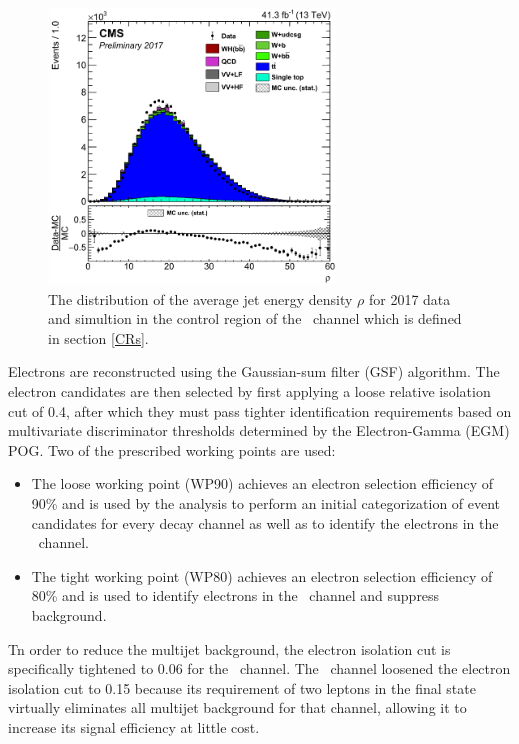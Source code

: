 \begin{figure}[htbp]
  \centering
    \includegraphics[width=3in]{images/rho}
    \caption[Average Jet Energy Density in 2017 Data]{The distribution of the average jet energy density $\rho$ for 2017 data and simultion in the \qrkt\qrktbar control region of the \WlnH\ channel which is defined in section \ref{CRs}.}
    \label{fig:rho}
\end{figure}

Electrons are reconstructed using the Gaussian-sum filter (GSF) algorithm.\cite{GSFTRACK} The electron candidates are then selected by first applying a loose relative isolation cut of 0.4, after which they must pass tighter identification requirements based on multivariate discriminator thresholds determined by the Electron-Gamma (EGM) POG. Two of the prescribed working points are used:
\begin{itemize}
  \item The loose working point (WP90) achieves an electron selection efficiency of 90\% and is used by the analysis to perform an initial categorization of event candidates for every decay channel as well as to identify the electrons in the \ZeeH\ channel.
  \item The tight working point (WP80) achieves an electron selection efficiency of 80\% and is used to identify electrons in the \WenH\ channel and suppress background.
\end{itemize}
Tn order to reduce the multijet background, the electron isolation cut is specifically tightened to 0.06 for the \WenH\ channel. The \ZeeH\ channel loosened the electron isolation cut to 0.15 because its requirement of two leptons in the final state virtually eliminates all multijet background for that channel, allowing it to increase its signal efficiency at little cost.

